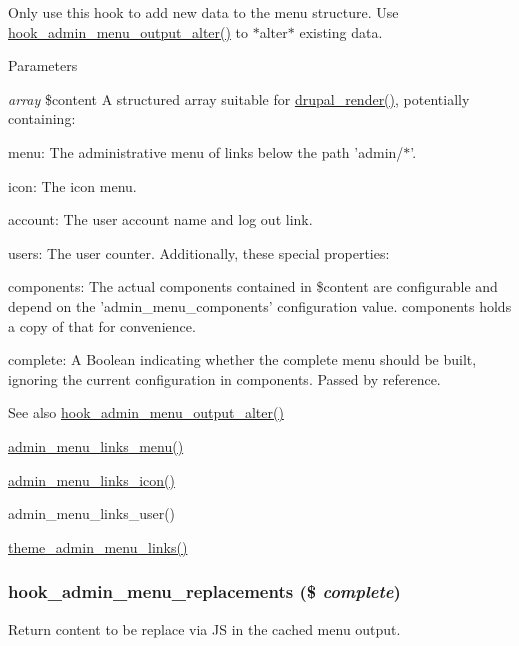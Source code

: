 Only use this hook to add new data to the menu structure. Use \hyperlink{admin__menu_8api_8php_a7502be228e9b3e1a04cbc17fa0e42b25}{hook\_\-admin\_\-menu\_\-output\_\-alter()} to $\ast$alter$\ast$ existing data.


\begin{DoxyParams}{Parameters}
\item[{\em array}]\$content A structured array suitable for \hyperlink{common_8inc_a05798b44e8d6c496d4bee5cc32fa7851}{drupal\_\-render()}, potentially containing:
\begin{DoxyItemize}
\item menu: The administrative menu of links below the path 'admin/$\ast$'.
\item icon: The icon menu.
\item account: The user account name and log out link.
\item users: The user counter. Additionally, these special properties:
\item components: The actual components contained in \$content are configurable and depend on the 'admin\_\-menu\_\-components' configuration value. components holds a copy of that for convenience.
\item complete: A Boolean indicating whether the complete menu should be built, ignoring the current configuration in components. Passed by reference.
\end{DoxyItemize}\end{DoxyParams}
\begin{DoxySeeAlso}{See also}
\hyperlink{admin__menu_8api_8php_a7502be228e9b3e1a04cbc17fa0e42b25}{hook\_\-admin\_\-menu\_\-output\_\-alter()} 

\hyperlink{admin__menu_8inc_afbb93090bb402d1d524e666d370ffec5}{admin\_\-menu\_\-links\_\-menu()} 

\hyperlink{admin__menu_8inc_abb0305b57b5e84d5bb49059d16e55aa0}{admin\_\-menu\_\-links\_\-icon()} 

admin\_\-menu\_\-links\_\-user() 

\hyperlink{admin__menu_8module_a33d1120bbd0ebf32f21f44c17b831475}{theme\_\-admin\_\-menu\_\-links()} 
\end{DoxySeeAlso}
\hypertarget{admin__menu_8api_8php_af3a48610c3fd1e828a053625d0184fa1}{
\subsubsection[{hook\_\-admin\_\-menu\_\-replacements}]{\setlength{\rightskip}{0pt plus 5cm}hook\_\-admin\_\-menu\_\-replacements (\$ {\em complete})}}
\label{admin__menu_8api_8php_af3a48610c3fd1e828a053625d0184fa1}
Return content to be replace via JS in the cached menu output.



